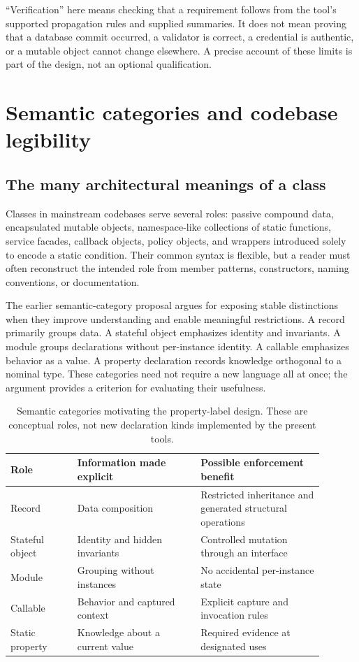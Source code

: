 \documentclass[11pt]{article}
\begin{document}
``Verification'' here means checking that a requirement follows from the
tool's supported propagation rules and supplied summaries. It does not mean
proving that a database commit occurred, a validator is correct, a credential
is authentic, or a mutable object cannot change elsewhere. A precise account
of these limits is part of the design, not an optional qualification.

\section{Semantic categories and codebase legibility}
\subsection{The many architectural meanings of a class}
Classes in mainstream codebases serve several roles: passive compound data,
encapsulated mutable objects, namespace-like collections of static functions,
service facades, callback objects, policy objects, and wrappers introduced
solely to encode a static condition. Their common syntax is flexible, but a
reader must often reconstruct the intended role from member patterns,
constructors, naming conventions, or documentation.

The earlier semantic-category proposal argues for exposing stable distinctions
when they improve understanding and enable meaningful restrictions. A record
primarily groups data. A stateful object emphasizes identity and invariants.
A module groups declarations without per-instance identity. A callable
emphasizes behavior as a value. A property declaration records knowledge
orthogonal to a nominal type. These categories need not require a new language
all at once; the argument provides a criterion for evaluating their usefulness.

\begin{table}[ht]
\centering\small
\begin{tabular}{>{\raggedright\arraybackslash}p{0.19\linewidth}>{\raggedright\arraybackslash}p{0.35\linewidth}>{\raggedright\arraybackslash}p{0.35\linewidth}}
\toprule
Role & Information made explicit & Possible enforcement benefit\\
\midrule
Record & Data composition & Restricted inheritance and generated structural operations\\
Stateful object & Identity and hidden invariants & Controlled mutation through an interface\\
Module & Grouping without instances & No accidental per-instance state\\
Callable & Behavior and captured context & Explicit capture and invocation rules\\
Static property & Knowledge about a current value & Required evidence at designated uses\\
\bottomrule
\end{tabular}
\caption{Semantic categories motivating the property-label design. These are
conceptual roles, not new declaration kinds implemented by the present tools.}
\end{table}
\end{document}
